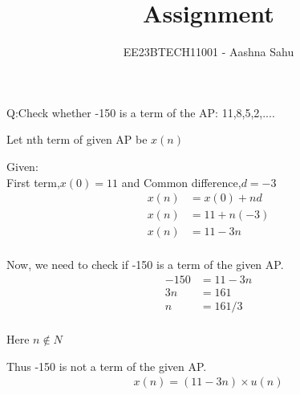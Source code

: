 \documentclass[journal,12pt,twocolumn]{IEEEtran}
\theoremstyle{remark}
\begin{document}
\let\vec\mathbf



\vspace{3cm}
\title{Assignment}
\author{EE23BTECH11001 - Aashna Sahu}
\maketitle
\newpage
\bigskip

\renewcommand{\thefigure}{\theenumi}
\renewcommand{\thetable}{\theenumi}
Q:Check whether -150 is a term of the AP: 11,8,5,2,....

 \solution
Let nth term of given AP be $x(n)$

Given:\\

First term,$x(0)=11$ and Common difference,$d= -3$\\
\[\begin{aligned}
x(n)&=x(0)+nd\\
x(n)&=11+n(-3)\\
x(n)&= 11-3n\\
\end{aligned}\]

Now, we need to check if -150 is a term of the given AP.\\
\[\begin{aligned}
-150&= 11-3n\\
3n&=161\\
n&=161/3\\
\end{aligned}\]
\begin{center}
Here $n \notin N$\\
\end{center}
Thus -150 is not a term of the given AP.
\begin{align}
 \boxed{x(n)=(11-3n)\times u(n)}   
\end{align}
\end{document}
